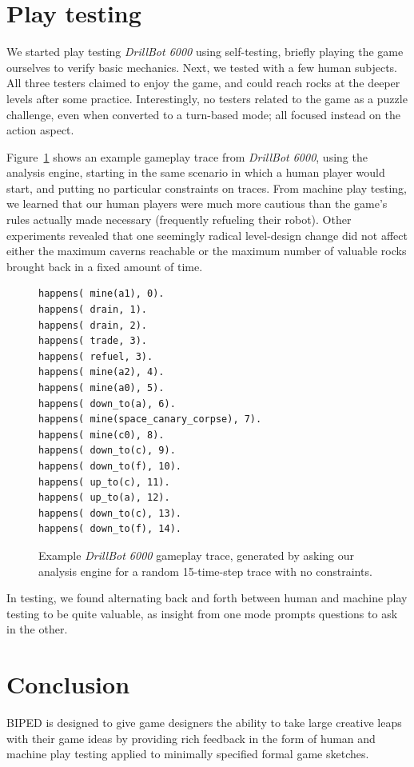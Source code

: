 \documentclass[letterpaper]{article}
\begin{document}
\section{Play testing}

We started play testing \emph{DrillBot 6000} using self-testing, briefly
playing the game ourselves to verify basic mechanics. Next, we tested with a
few human subjects. All three testers claimed to enjoy the game, and could
reach rocks at the deeper levels after some practice.  Interestingly, no
testers related to the game as a puzzle challenge, even when converted to a
turn-based mode; all focused instead on the action aspect.

Figure~\ref{fig:trace} shows an example gameplay trace from \emph{DrillBot
6000}, using the analysis engine, starting in the same scenario in which a
human player would start, and putting no particular constraints on traces.
From machine play testing, we learned that our human players were much more
cautious than the game's rules actually made necessary (frequently refueling
their robot). Other experiments revealed that one seemingly radical
level-design change did not affect either the maximum caverns reachable or the
maximum number of valuable rocks brought back in a fixed amount of time.

\begin{figure}
\begin{Verbatim}[frame=single,fontsize=\scriptsize]
happens( mine(a1), 0).
happens( drain, 1).
happens( drain, 2).
happens( trade, 3).
happens( refuel, 3).
happens( mine(a2), 4).
happens( mine(a0), 5).
happens( down_to(a), 6).
happens( mine(space_canary_corpse), 7).
happens( mine(c0), 8).
happens( down_to(c), 9).
happens( down_to(f), 10).
happens( up_to(c), 11).
happens( up_to(a), 12).
happens( down_to(c), 13).
happens( down_to(f), 14).
\end{Verbatim}
\caption{Example \emph{DrillBot 6000} gameplay trace, generated by asking our
analysis engine for a random 15-time-step trace with no constraints.}
\label{fig:trace}
\end{figure}

In testing, we found alternating back and forth between human and machine play
testing to be quite valuable, as insight from one mode prompts questions to ask
in the other.

\section{Conclusion}

BIPED is designed to give game designers the ability to take large creative
leaps with their game ideas by providing rich feedback in the form of human
and machine play testing applied to minimally specified formal game sketches.

 
\end{document}
